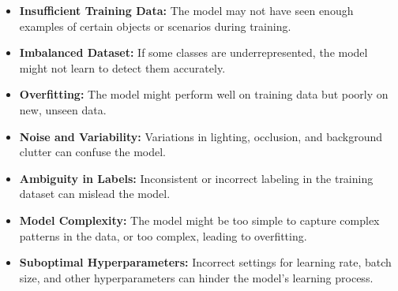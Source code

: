 \documentclass[conference]{IEEEtran}
\begin{document}
\begin{itemize}
  \item \textbf{Insufficient Training Data:} The model may not have seen enough examples of certain objects or scenarios during training.
  \item \textbf{Imbalanced Dataset:} If some classes are underrepresented, the model might not learn to detect them accurately.
  \item \textbf{Overfitting:} The model might perform well on training data but poorly on new, unseen data.
  \item \textbf{Noise and Variability:} Variations in lighting, occlusion, and background clutter can confuse the model.
  \item \textbf{Ambiguity in Labels:} Inconsistent or incorrect labeling in the training dataset can mislead the model.
  \item \textbf{Model Complexity:} The model might be too simple to capture complex patterns in the data, or too complex, leading to overfitting.
  \item \textbf{Suboptimal Hyperparameters:} Incorrect settings for learning rate, batch size, and other hyperparameters can hinder the model's learning process.
\end{itemize}
\end{document}
